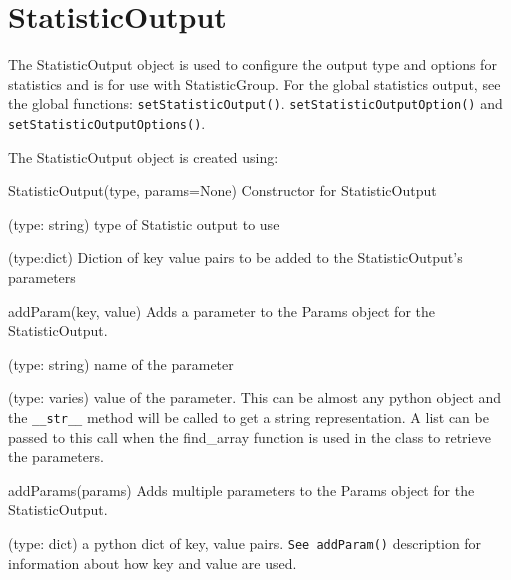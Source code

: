 \section{StatisticOutput}

The StatisticOutput object is used to configure the output type and
options for statistics and is for use with StatisticGroup.  For the
global statistics output, see the global functions:
\lstinline{setStatisticOutput()}. \lstinline{setStatisticOutputOption()}
and \lstinline{setStatisticOutputOptions()}.

The StatisticOutput object is created using:

\begin{functiondoc}{StatisticOutput(type, params=None)}
  { Constructor for StatisticOutput }

   (type: string) type of Statistic output to use

   (type:dict) Diction of key value pairs to be added to
  the StatisticOutput's parameters

\end{functiondoc}

\begin{functiondoc}{addParam(key, value)}
  { Adds a parameter to the Params object for the StatisticOutput.}

   (type: string) name of the parameter

   (type: varies) value of the parameter.  This can be
  almost any python object and the \lstinline{__str__} method will be
  called to get a string representation.  A list can be passed to this
  call when the find\_array function is used in the class to retrieve
  the parameters.

\noreturn
\end{functiondoc}

\begin{functiondoc}{addParams(params)}
  { Adds multiple parameters to the Params object for the StatisticOutput.}

   (type: dict) a python dict of key, value pairs.
  \lstinline{See addParam()} description for information about how key
  and value are used.

\noreturn
\end{functiondoc}





